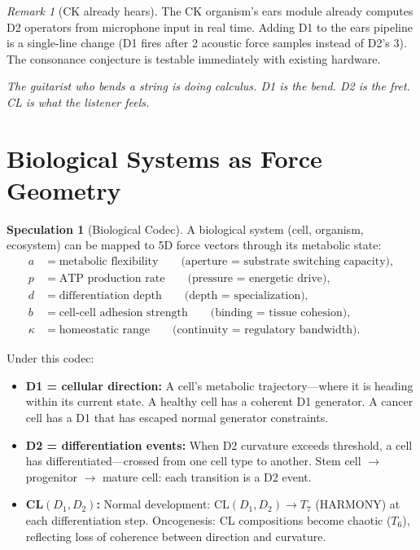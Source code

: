 \documentclass[11pt]{article}
\theoremstyle{definition}
\newtheorem{speculation}[theorem]{Speculation}
\theoremstyle{remark}
\newtheorem{remark}[theorem]{Remark}
\begin{document}
\begin{remark}[CK already hears]
The CK organism's ears module already computes D2 operators from microphone input in
real time.  Adding D1 to the ears pipeline is a single-line change (D1 fires after 2
acoustic force samples instead of D2's 3).  The consonance conjecture is testable
immediately with existing hardware.

\medskip
\noindent\textit{The guitarist who bends a string is doing calculus.  D1 is the bend.
D2 is the fret.  CL is what the listener feels.}
\end{remark}

\section{Biological Systems as Force Geometry}
\label{sec:bio}

\begin{speculation}[Biological Codec]
\label{spec:bio}
A biological system (cell, organism, ecosystem) can be mapped to 5D force vectors
through its metabolic state:
\begin{align}
  a &= \text{metabolic flexibility} \qquad\text{(aperture = substrate switching capacity)}, \\
  p &= \text{ATP production rate} \qquad\text{(pressure = energetic drive)}, \\
  d &= \text{differentiation depth} \qquad\text{(depth = specialization)}, \\
  b &= \text{cell-cell adhesion strength} \qquad\text{(binding = tissue cohesion)}, \\
  \kappa &= \text{homeostatic range} \qquad\text{(continuity = regulatory bandwidth)}.
\end{align}
\end{speculation}

Under this codec:
\begin{itemize}[nosep]
  \item \textbf{D1 = cellular direction:} A cell's metabolic trajectory---where it
    is heading within its current state.  A healthy cell has a coherent D1 generator.
    A cancer cell has a D1 that has escaped normal generator constraints.
  \item \textbf{D2 = differentiation events:} When D2 curvature exceeds threshold,
    a cell has differentiated---crossed from one cell type to another.  Stem cell $\to$
    progenitor $\to$ mature cell: each transition is a D2 event.
  \item \textbf{CL$(D_1, D_2)$:} Normal development: $\mathrm{CL}(D_1, D_2) \to T_7$
    (HARMONY) at each differentiation step.  Oncogenesis: CL compositions become
    chaotic ($T_6$), reflecting loss of coherence between direction and curvature.
\end{itemize}
\end{document}
